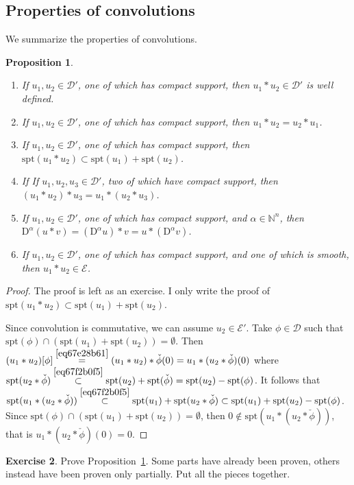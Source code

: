 \documentclass[a4paper,9pt]{amsart}
\newcommand{\scr}[1]{\mathscr{#1}}
\newcommand{\N}{\mathbb{N}}	%
\newcommand{\Diff}{\mathrm{D}}
\newcommand{\spt}{\mathrm{spt}}
\theoremstyle{plain}
\newtheorem{proposition}{Proposition}[section]
\theoremstyle{definition}
\newtheorem{exercise}[proposition]{Exercise}%
\theoremstyle{remark}
\begin{document}
\subsection{Properties of convolutions}\label{subs67ebb2f1}
We summarize the properties of convolutions.
\begin{proposition}\label{prop67f2a0bd}
	\begin{enumerate}
	\item
	If $u_1,u_2\in\scr D'$, one of which has compact support, 
	then $u_1 * u_2 \in\scr D'$ is well defined.
	\item
	If $u_1,u_2\in\scr D'$, one of which has compact support,
	then $u_1*u_2 = u_2*u_1$.
	\item
	If $u_1,u_2\in\scr D'$, one of which has compact support,
	then $\spt(u_1*u_2) \subset \spt(u_1) + \spt(u_2)$.
	\item
	If  If $u_1,u_2,u_3\in\scr D'$, two of which have compact support,
	then $(u_1*u_2)*u_3 = u_1*(u_2*u_3)$.
	\item
	If $u_1,u_2\in\scr D'$, one of which has compact support,
	and $\alpha\in\N^n$,
	then $\Diff^\alpha(u*v) = (\Diff^\alpha u)*v = u*(\Diff^\alpha v)$.
	\item
	If $u_1,u_2\in\scr D'$, one of which has compact support, and one of which is smooth,
	then $u_1 * u_2 \in\scr E$.
	\end{enumerate}
\end{proposition}
\begin{proof}
	The proof is left as an exercise.
	I only write the proof of $\spt(u_1*u_2) \subset \spt(u_1) + \spt(u_2)$.
	
	Since convolution is commutative, we can assume $u_2\in\scr E'$.
	Take $\phi\in\scr D$ such that $\spt(\phi) \cap (\spt(u_1) + \spt(u_2)) = \emptyset$.
	Then $(u_1*u_2)[\phi] 
	\overset{\eqref{eq67e28b61}}= (u_1*u_2)*\check\phi(0)
	= u_1*(u_2*\check\phi)(0)$
	where $\spt(u_2*\check\phi) \overset{\eqref{eq67f2b0f5}}\subset \spt(u_2) + \spt(\check\phi)  = \spt(u_2) -\spt(\phi)$.
	It follows that $\spt(u_1*(u_2*\check\phi)) \overset{\eqref{eq67f2b0f5}}\subset \spt(u_1) + \spt(u_2*\check\phi) \subset \spt(u_1) + \spt(u_2) - \spt(\phi)$.
	Since $\spt(\phi) \cap (\spt(u_1) + \spt(u_2)) = \emptyset$, then $0\notin \spt(u_1*(u_2*\check\phi))$, that is $u_1*(u_2*\check\phi)(0)=0$.
\end{proof}

\begin{exercise}
	Prove Proposition~\ref{prop67f2a0bd}.
	Some parts have already been proven, others instead have been proven only partially.
	Put all the pieces together.
\end{exercise}
\end{document}

